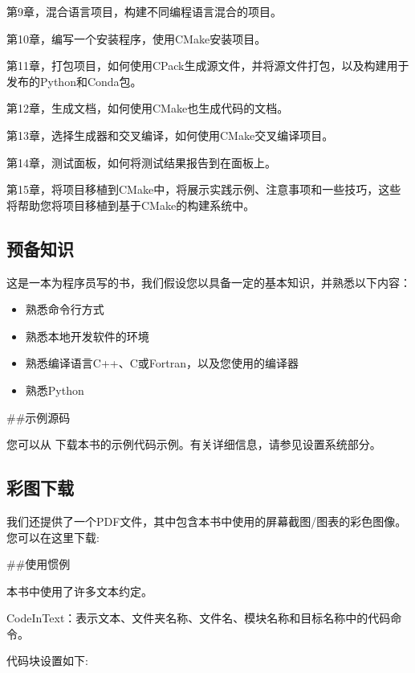 第9章，混合语言项目，构建不同编程语言混合的项目。

第10章，编写一个安装程序，使用CMake安装项目。

第11章，打包项目，如何使用CPack生成源文件，并将源文件打包，以及构建用于发布的Python和Conda包。

第12章，生成文档，如何使用CMake也生成代码的文档。

第13章，选择生成器和交叉编译，如何使用CMake交叉编译项目。

第14章，测试面板，如何将测试结果报告到在面板上。

第15章，将项目移植到CMake中，将展示实践示例、注意事项和一些技巧，这些将帮助您将项目移植到基于CMake的构建系统中。

\subsection{预备知识}

这是一本为程序员写的书，我们假设您以具备一定的基本知识，并熟悉以下内容：

\begin{itemize}
\item 熟悉命令行方式

\item 熟悉本地开发软件的环境

\item 熟悉编译语言C++、C或Fortran，以及您使用的编译器

\item 熟悉Python

\end{itemize}

\#\#示例源码

您可以从  下载本书的示例代码示例。有关详细信息，请参见设置系统部分。

\subsection{彩图下载}

我们还提供了一个PDF文件，其中包含本书中使用的屏幕截图/图表的彩色图像。您可以在这里下载: 

\#\#使用惯例

本书中使用了许多文本约定。

CodeInText：表示文本、文件夹名称、文件名、模块名称和目标名称中的代码命令。

代码块设置如下:

